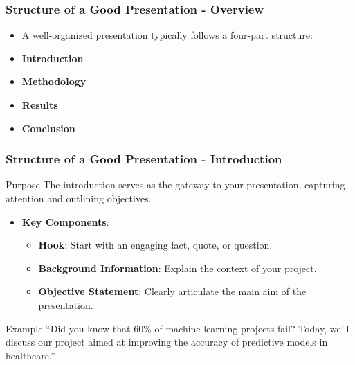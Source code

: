 \documentclass[aspectratio=169]{beamer}
\begin{document}
\begin{frame}[fragile]
    \frametitle{Structure of a Good Presentation - Overview}
    \begin{itemize}
        \item A well-organized presentation typically follows a four-part structure:
        \item \textbf{Introduction}
        \item \textbf{Methodology}
        \item \textbf{Results}
        \item \textbf{Conclusion}
    \end{itemize}
\end{frame}

\begin{frame}[fragile]
    \frametitle{Structure of a Good Presentation - Introduction}
    \begin{block}{Purpose}
        The introduction serves as the gateway to your presentation, capturing attention and outlining objectives.
    \end{block}
    
    \begin{itemize}
        \item \textbf{Key Components}:
        \begin{itemize}
            \item \textbf{Hook}: Start with an engaging fact, quote, or question.
            \item \textbf{Background Information}: Explain the context of your project.
            \item \textbf{Objective Statement}: Clearly articulate the main aim of the presentation.
        \end{itemize}
    \end{itemize}

    \begin{block}{Example}
        “Did you know that 60\% of machine learning projects fail? Today, we'll discuss our project aimed at improving the accuracy of predictive models in healthcare.”
    \end{block}
\end{frame}
\end{document}
